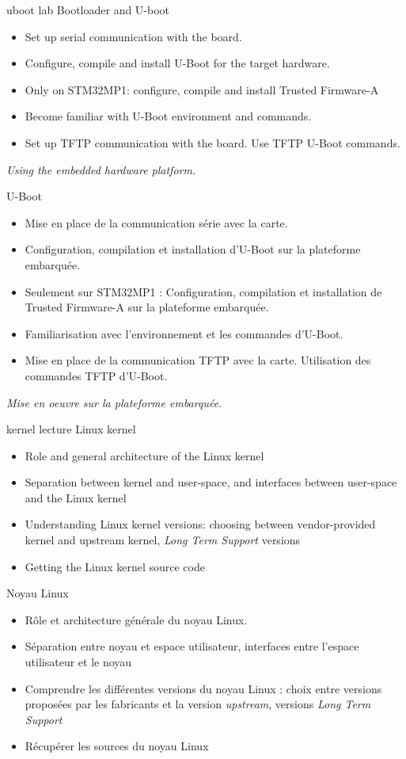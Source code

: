 {uboot}
{lab}
{Bootloader and U-boot}
{
  \begin{itemize}
  \item Set up serial communication with the board.
  \item Configure, compile and install U-Boot for the target hardware.
  \item Only on STM32MP1: configure, compile and install Trusted Firmware-A
  \item Become familiar with U-Boot environment and commands.
  \item Set up TFTP communication with the board. Use TFTP U-Boot
    commands.
  \end{itemize}

  \vspace{0.5cm}
  {\em Using the embedded hardware platform.}
}
{U-Boot}
{
  \begin{itemize}
  \item Mise en place de la communication série avec la carte.
  \item Configuration, compilation et installation d'U-Boot sur la
    plateforme embarquée.
  \item Seulement sur STM32MP1 : Configuration, compilation et
    installation de Trusted Firmware-A sur la plateforme embarquée.
  \item Familiarisation avec l'environnement et les commandes
    d'U-Boot.
  \item Mise en place de la communication TFTP avec la carte.
    Utilisation des commandes TFTP d'U-Boot.
  \end{itemize}

  \vspace{0.5cm}
  {\em Mise en oeuvre sur la plateforme embarquée.}
}
{kernel}
{lecture}
{Linux kernel}
{
  \begin{itemize}
  \item Role and general architecture of the Linux kernel
  \item Separation between kernel and user-space, and interfaces
    between user-space and the Linux kernel
  \item Understanding Linux kernel versions: choosing between
    vendor-provided kernel and upstream kernel, {\em Long Term
      Support} versions
  \item Getting the Linux kernel source code
  \end{itemize}
}
{Noyau Linux}
{
  \begin{itemize}
  \item Rôle et architecture générale du noyau Linux.
  \item Séparation entre noyau et espace utilisateur, interfaces entre
    l'espace utilisateur et le noyau
  \item Comprendre les différentes versions du noyau Linux : choix
    entre versions proposées par les fabricants et la version {\em
      upstream}, versions {\em Long Term Support}
  \item Récupérer les sources du noyau Linux
  \end{itemize}
}
